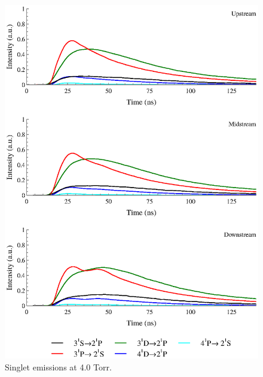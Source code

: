 \begin{figure}
  \centering
  \includegraphics{./chapters/extraem/figures/4torr_s.eps}
  \caption{Singlet emissions at 4.0 Torr.}
\end{figure}
